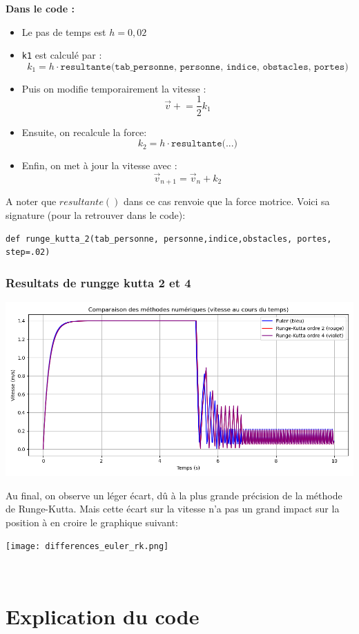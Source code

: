 \documentclass[a4paper,12pt]{article}
\begin{document}
\textbf{Dans le code :}
\begin{itemize}
    \item Le pas de temps est $h = 0{,}02$
    \item \texttt{k1} est calculé par :
    \[
    k_1 = h \cdot \texttt{resultante(tab\_personne, personne, indice, obstacles, portes)}
    \]
    \item Puis on modifie temporairement la vitesse :
    \[
    \vec{v} \mathrel{+}= \frac{1}{2} k_1
    \]
    \item Ensuite, on recalcule la force:
    \[
    k_2 = h \cdot \texttt{resultante(...)}
    \]
    \item Enfin, on met à jour la vitesse avec :
    \[
    \vec{v}_{n+1} = \vec{v}_n + k_2
    \]
\end{itemize}
\hspace{1em}
A noter que $resultante()$ dans ce cas renvoie que la force motrice. Voici sa signature (pour la retrouver dans le code):
\begin{verbatim}
def runge_kutta_2(tab_personne, personne,indice,obstacles, portes, step=.02)
\end{verbatim}
\subsubsection{Resultats de rungge kutta 2 et 4}

\includegraphics[width=\textwidth]{runge.png}

Au final, on observe un léger écart, dû à la plus grande précision de la méthode de Runge-Kutta. Mais cette écart sur la vitesse n'a pas un grand impact sur la position à en croire le graphique suivant:


\texttt{[image: differences\_euler\_rk.png]}


\
\section{Explication du code}
\end{document}
